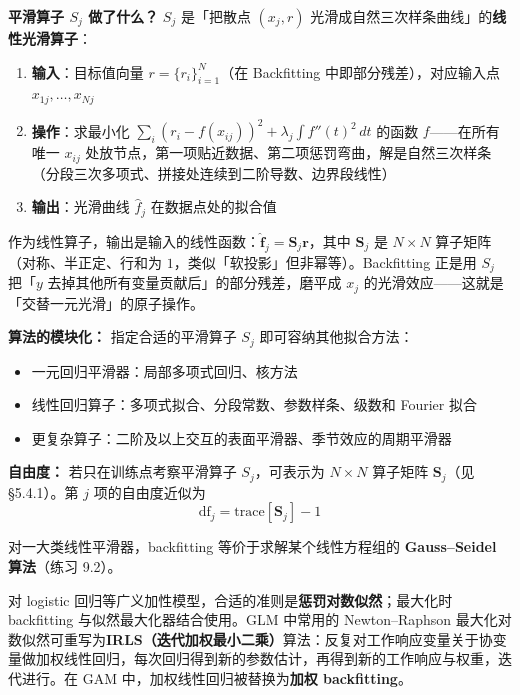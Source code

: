 \textbf{平滑算子 $S_j$ 做了什么？} $S_j$ 是「把散点 $(x_j, r)$ 光滑成自然三次样条曲线」的\textbf{线性光滑算子}：
\begin{enumerate}
    \item \textbf{输入}：目标值向量 $r = \{r_i\}_{i=1}^{N}$（在 Backfitting 中即部分残差），对应输入点 $x_{1j}, \ldots, x_{Nj}$
    \item \textbf{操作}：求最小化 $\sum_i (r_i - f(x_{ij}))^2 + \lambda_j \int f''(t)^2\,dt$ 的函数 $f$——在所有唯一 $x_{ij}$ 处放节点，第一项贴近数据、第二项惩罚弯曲，解是自然三次样条（分段三次多项式、拼接处连续到二阶导数、边界段线性）
    \item \textbf{输出}：光滑曲线 $\hat f_j$ 在数据点处的拟合值
\end{enumerate}
作为线性算子，输出是输入的线性函数：$\hat{\mathbf f}_j = \mathbf S_j \mathbf r$，其中 $\mathbf S_j$ 是 $N \times N$ 算子矩阵（对称、半正定、行和为 $1$，类似「软投影」但非幂等）。Backfitting 正是用 $S_j$ 把「$y$ 去掉其他所有变量贡献后」的部分残差，磨平成 $x_j$ 的光滑效应——这就是「交替一元光滑」的原子操作。

\textbf{算法的模块化：} 指定合适的平滑算子 $S_j$ 即可容纳其他拟合方法：
\begin{itemize}
    \item 一元回归平滑器：局部多项式回归、核方法
    \item 线性回归算子：多项式拟合、分段常数、参数样条、级数和 Fourier 拟合
    \item 更复杂算子：二阶及以上交互的表面平滑器、季节效应的周期平滑器
\end{itemize}

\textbf{自由度：} 若只在训练点考察平滑算子 $S_j$，可表示为 $N \times N$ 算子矩阵 $\mathbf{S}_j$（见 §5.4.1）。第 $j$ 项的自由度近似为
\begin{equation}
    \mathrm{df}_j = \mathrm{trace}[\mathbf{S}_j] - 1
\end{equation}

对一大类线性平滑器，backfitting 等价于求解某个线性方程组的 \textbf{Gauss--Seidel 算法}（练习 9.2）。

对 logistic 回归等广义加性模型，合适的准则是\textbf{惩罚对数似然}；最大化时 backfitting 与似然最大化器结合使用。GLM 中常用的 Newton--Raphson 最大化对数似然可重写为\textbf{IRLS（迭代加权最小二乘）}算法：反复对工作响应变量关于协变量做加权线性回归，每次回归得到新的参数估计，再得到新的工作响应与权重，迭代进行。在 GAM 中，加权线性回归被替换为\textbf{加权 backfitting}。


